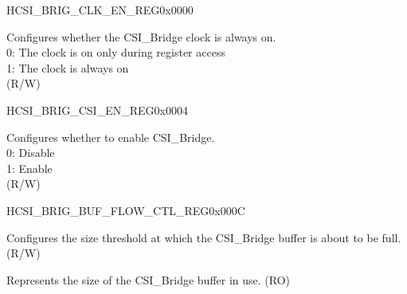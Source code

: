 \begin{register}{H}{CSI\_BRIG\_CLK\_EN\_REG}{0x0000}\label{regdesc:CSIBRIGCLKENREG}
%
%
\regnewline%
\begin{regdesc}\begin{reglist}
\label{fielddesc:CSIBRIGCLKEN}\item [CSI\_BRIG\_CLK\_EN] Configures whether the CSI\_Bridge clock is always on.\\0: The clock is on only during register access\\1: The clock is always on\\(R/W)
\end{reglist}\end{regdesc}
\end{register}


\begin{register}{H}{CSI\_BRIG\_CSI\_EN\_REG}{0x0004}\label{regdesc:CSIBRIGCSIENREG}
%
%
\regnewline%
\begin{regdesc}\begin{reglist}
\label{fielddesc:CSIBRIGCSIBRIGEN}\item [CSI\_BRIG\_CSI\_BRIG\_EN] Configures whether to enable CSI\_Bridge.\\0: Disable\\1: Enable\\(R/W)
\end{reglist}\end{regdesc}
\end{register}


\begin{register}{H}{CSI\_BRIG\_BUF\_FLOW\_CTL\_REG}{0x000C}\label{regdesc:CSIBRIGBUFFLOWCTLREG}
%
%
%
%
\regnewline%
\begin{regdesc}\begin{reglist}
\label{fielddesc:CSIBRIGCSIBUFAFULLTHRD}\item [CSI\_BRIG\_CSI\_BUF\_AFULL\_THRD] Configures the size threshold at which the CSI\_Bridge buffer is about to be full. (R/W)
\label{fielddesc:CSIBRIGCSIBUFDEPTH}\item [CSI\_BRIG\_CSI\_BUF\_DEPTH] Represents the size of the CSI\_Bridge buffer in use. (RO)
\end{reglist}\end{regdesc}
\end{register}


